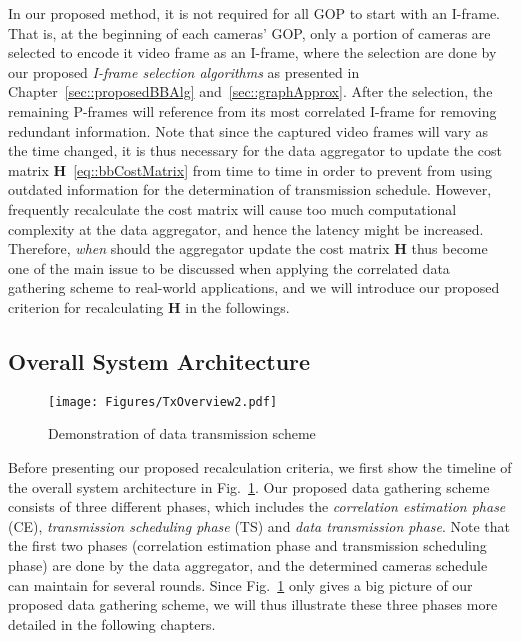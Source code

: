 {In our proposed method, it is not required for all GOP to start with an I-frame.
That is, at the beginning of each cameras' GOP, only a portion of cameras are selected to encode it video frame as an I-frame, where the selection are done by our proposed \emph{I-frame selection algorithms} as presented in Chapter~\ref{sec::proposedBBAlg} and~\ref{sec::graphApprox}.
After the selection, the remaining P-frames will reference from its most correlated I-frame for removing redundant information.
Note that since the captured video frames will vary as the time changed, it is thus necessary for the data aggregator to update the cost matrix $\mathbf{H}$~\eqref{eq::bbCostMatrix} from time to time in order to prevent from using outdated information for the determination of transmission schedule.
However, frequently recalculate the cost matrix will cause too much computational complexity at the data aggregator, and hence the latency might be increased.
Therefore, \emph{when} should the aggregator update the cost matrix $\mathbf{H}$ thus become one of the main issue to be discussed when applying the correlated data gathering scheme to real-world applications, and we will introduce our proposed criterion for recalculating $\mathbf{H}$ in the followings.
%
\subsection{Overall System Architecture}
\label{sec::overallSystemArchi}
%
\begin{figure}
\begin{center}
\texttt{[image: Figures/TxOverview2.pdf]}
\caption{\label{fig::txOverview}Demonstration of data transmission scheme}
\end{center}
\end{figure}
%
Before presenting our proposed recalculation criteria, we first show the timeline of the overall system architecture in Fig.~\ref{fig::txOverview}.
Our proposed data gathering scheme consists of three different phases, which includes the \emph{correlation estimation phase} (CE), \emph{transmission scheduling phase} (TS) and \emph{data transmission phase}.
Note that the first two phases (correlation estimation phase and transmission scheduling phase) are done by the data aggregator, and the determined cameras schedule can maintain for several rounds.
Since Fig.~\ref{fig::txOverview} only gives a big picture of our proposed data gathering scheme, we will thus illustrate these three phases more detailed in the following chapters. 
%
}
